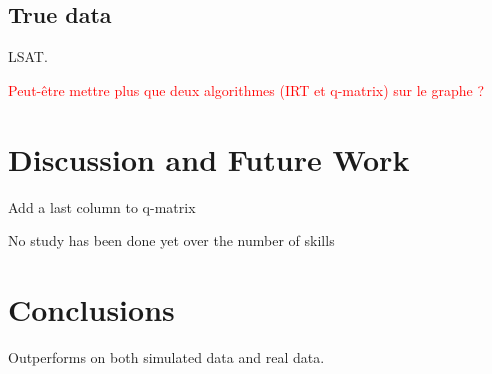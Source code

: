 \documentclass{sig-alternate}
\newcommand\alert[1]{\textcolor{red}{#1}}
\begin{document}
\subsection{True data}

LSAT.

\alert{Peut-être mettre plus que deux algorithmes (IRT et q-matrix) sur le graphe ?}

\section{Discussion and Future Work}

Add a last column to q-matrix

No study has been done yet over the number of skills

\section{Conclusions}

Outperforms on both simulated data and real data.

%


%
%

\end{document}
